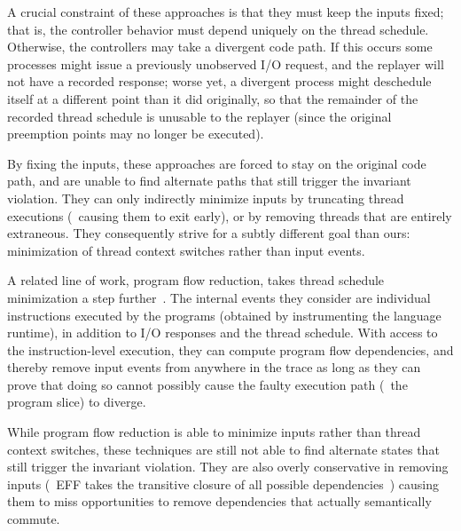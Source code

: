 A crucial constraint of these approaches is that they must keep the inputs
fixed; that is, the controller behavior must depend uniquely on the thread
schedule. Otherwise, the controllers may take a divergent code path. If this
occurs some processes might issue a previously unobserved I/O request, and the replayer will not
have a recorded response; worse yet, a divergent process might deschedule
itself at a different point than it did originally, so that the remainder of
the recorded thread schedule is unusable to the replayer (since the original preemption points
may no longer be executed).

By fixing the inputs, these approaches are forced to stay on the original code
path, and are unable to find alternate paths that still
trigger the invariant violation. They can only indirectly
minimize inputs by truncating thread executions (\ie~causing them to
exit early), or by removing threads that are entirely extraneous.
They consequently strive for a subtly different goal than ours:
minimization of thread context switches rather than input events.


A related line of work, program flow reduction, takes thread schedule
minimization a step further~\cite{Lee:2011:TGR:1993498.1993528, tallam2007enabling, huang2012lean}.
The internal events they consider are individual instructions executed by the
programs (obtained by instrumenting the language runtime), in addition to I/O responses and the thread schedule.
With access to the instruction-level execution, they can compute
program flow dependencies, and thereby remove input events from anywhere in the trace as long as they
can prove that doing so cannot possibly cause the faulty execution path (\ie~the program slice) to diverge.

While program flow reduction is able to minimize inputs rather than thread context switches,
these techniques are still not able to find alternate states that still
trigger the invariant violation. They are also overly conservative in
removing inputs (\eg~EFF takes the transitive closure of all possible
dependencies~\cite{Lee:2011:TGR:1993498.1993528}) causing them to miss opportunities to
remove dependencies that actually semantically commute.

